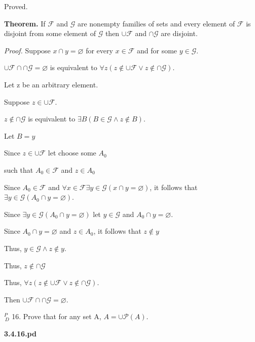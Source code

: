 \documentclass{article}
\begin{document}
Proved.

\textbf{Theorem.} If $\mathcal{F}$ and $\mathcal{G}$ are nonempty families of sets and every element of $\mathcal{F}$ is disjoint from some element of $\mathcal{G}$ then $\cup \mathcal{F}$ and $\cap \mathcal{G}$ are disjoint.

\textit{Proof.} Suppose $x \cap y = \varnothing$ for every $x \in \mathcal{F}$ and for some $y \in \mathcal{G}$.

\quad $\cup \mathcal{F} \cap \cap \mathcal{G} = \varnothing$ is equivalent to $\forall z (z \notin \cup \mathcal{F} \lor z \notin \cap \mathcal{G})$.

\quad Let z be an arbitrary element.

\quad \quad Suppose $z \in \cup \mathcal{F}$.

\quad \quad \quad $z \notin \cap \mathcal{G}$ is equivalent to $\exists B (B \in \mathcal{G} \land z \notin B)$.

\quad \quad \quad Let $B = y$

\quad \quad \quad \quad Since $z \in \cup \mathcal{F}$ let choose some $A_0$

\quad \quad \quad \quad such that $A_0 \in \mathcal{F}$ and $z \in A_0$

\quad \quad \quad \quad Since $A_0  \in \mathcal{F}$ and $\forall x \in \mathcal{F} \exists y \in \mathcal{G}(x \cap y = \varnothing)$, it follows that $\exists y \in \mathcal{G}(A_0 \cap y = \varnothing)$.

\quad \quad \quad \quad Since $\exists y \in \mathcal{G}(A_0 \cap y = \varnothing)$ let $y \in \mathcal{G}$ and $A_0 \cap y = \varnothing$.

\quad \quad \quad \quad Since $A_0 \cap y = \varnothing$ and $z \in A_0$, it follows that $z \notin y$

\quad \quad \quad Thus, $y \in \mathcal{G} \land z \notin y$.

\quad \quad Thus, $z \notin \cap \mathcal{G}$ 

\quad Thus, $\forall z (z \notin \cup \mathcal{F} \lor z \notin \cap \mathcal{G})$.

Then $\cup \mathcal{F} \cap \cap \mathcal{G} = \varnothing$.

\vspace{30pt}

$^{\textit{P}}_{\, \textit{D}}$ 16. Prove that for any set A, $A = \cup \mathcal{P} (A)$.
\vspace{30pt}

\textbf{3.4.16.pd}
\vspace{10pt}
\end{document}

